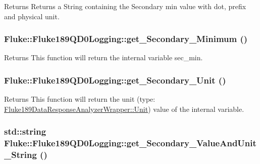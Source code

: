 \label{classFluke_1_1Fluke189QD0Logging_a592eb82801467a79a5bdd133bb5e5840}
\begin{DoxyReturn}{Returns}
Returns a String containing the Secondary min value with dot, prefix and physical unit. 
\end{DoxyReturn}
\hypertarget{classFluke_1_1Fluke189QD0Logging_a447e04b2f508cb4a821c2842b96115ae}{
\subsubsection[{get\_\-Secondary\_\-Minimum}]{ Fluke::Fluke189QD0Logging::get\_\-Secondary\_\-Minimum ()}}
\label{classFluke_1_1Fluke189QD0Logging_a447e04b2f508cb4a821c2842b96115ae}
\begin{DoxyReturn}{Returns}
This function will return the internal variable sec\_\-min. 
\end{DoxyReturn}
\hypertarget{classFluke_1_1Fluke189QD0Logging_a7d50361ed373ebaf4bf9cd7bf101f93d}{
\subsubsection[{get\_\-Secondary\_\-Unit}]{ Fluke::Fluke189QD0Logging::get\_\-Secondary\_\-Unit ()}}
\label{classFluke_1_1Fluke189QD0Logging_a7d50361ed373ebaf4bf9cd7bf101f93d}
\begin{DoxyReturn}{Returns}
This function will return the unit (type: \hyperlink{classFluke_1_1Fluke189DataResponseAnalyzerWrapper_ab8e5f2306e4d2ad3d741d273793aaed1}{Fluke189DataResponseAnalyzerWrapper::Unit}) value of the internal variable. 
\end{DoxyReturn}
\hypertarget{classFluke_1_1Fluke189QD0Logging_a5e36bbcb7bc5c45ffaf099af76c46d7e}{
\subsubsection[{get\_\-Secondary\_\-ValueAndUnit\_\-String}]{\setlength{\rightskip}{0pt plus 5cm}std::string Fluke::Fluke189QD0Logging::get\_\-Secondary\_\-ValueAndUnit\_\-String ()}}
